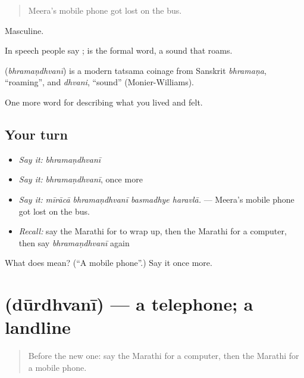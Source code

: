 \begin{quote}
Meera's mobile phone got lost on the bus.
\end{quote}

Masculine.

In speech people say ;  is the formal word, a sound that roams.

\begin{cousinweb}
\textbf{} (\emph{bhramaṇdhvanī}) is a modern tatsama coinage from Sanskrit \emph{bhramaṇa}, \textquotedblleft{}roaming\textquotedblright{}, and \emph{dhvani}, \textquotedblleft{}sound\textquotedblright{} (Monier-Williams).
\end{cousinweb}

\begin{grammarlens}[title={What you've built}]
One more word for describing what you lived and felt.
\end{grammarlens}

\subsection*{Your turn}
\begin{itemize}
\raggedright
  \item \emph{Say it:} \emph{bhramaṇdhvanī}
  \item \emph{Say it:} \emph{bhramaṇdhvanī}, once more
  \item \emph{Say it:} \emph{mīrācā bhramaṇdhvanī basmadhye haravlā.} — Meera's mobile phone got lost on the bus.
  \item \emph{Recall:} say the Marathi for to wrap up, then the Marathi for a computer, then say \emph{bhramaṇdhvanī} again
\end{itemize}

\begin{tcolorbox}[breakable,colback=teal!4,colframe=teal!35!black,title={Before you move on}]
What does  mean? (\textquotedblleft{}A mobile phone\textquotedblright{}.) Say it once more.
\end{tcolorbox}
\section[\texorpdfstring{\mr{दूरध्वनी} (dūrdhvanī)}{दूरध्वनी (dūrdhvanī)}]{ (dūrdhvanī) — a telephone; a landline}

\label{lesson:MR-C516-durdhvani}



\begin{quote}
Before the new one: say the Marathi for a computer, then the Marathi for a mobile phone.
\end{quote}

